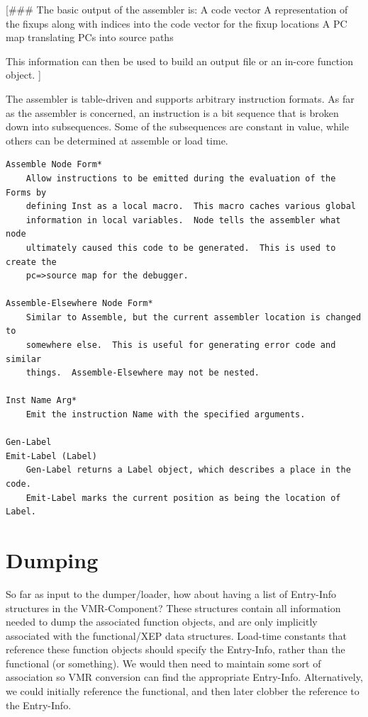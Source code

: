 [\#\#\# The basic output of the assembler is:
    A code vector
    A representation of the fixups along with indices into the code vector for
      the fixup locations
    A PC map translating PCs into source paths

This information can then be used to build an output file or an in-core
function object.
]

The assembler is table-driven and supports arbitrary instruction formats.  As
far as the assembler is concerned, an instruction is a bit sequence that is
broken down into subsequences.  Some of the subsequences are constant in value,
while others can be determined at assemble or load time.

\begin{verbatim}
Assemble Node Form*
    Allow instructions to be emitted during the evaluation of the Forms by
    defining Inst as a local macro.  This macro caches various global
    information in local variables.  Node tells the assembler what node
    ultimately caused this code to be generated.  This is used to create the
    pc=>source map for the debugger.

Assemble-Elsewhere Node Form*
    Similar to Assemble, but the current assembler location is changed to
    somewhere else.  This is useful for generating error code and similar
    things.  Assemble-Elsewhere may not be nested.

Inst Name Arg*
    Emit the instruction Name with the specified arguments.

Gen-Label
Emit-Label (Label)
    Gen-Label returns a Label object, which describes a place in the code.
    Emit-Label marks the current position as being the location of Label.
\end{verbatim}


\chapter{Dumping}

So far as input to the dumper/loader, how about having a list of Entry-Info
structures in the VMR-Component?  These structures contain all information
needed to dump the associated function objects, and are only implicitly
associated with the functional/XEP data structures.  Load-time constants that
reference these function objects should specify the Entry-Info, rather than the
functional (or something).  We would then need to maintain some sort of
association so VMR conversion can find the appropriate Entry-Info.
Alternatively, we could initially reference the functional, and then later
clobber the reference to the Entry-Info.

